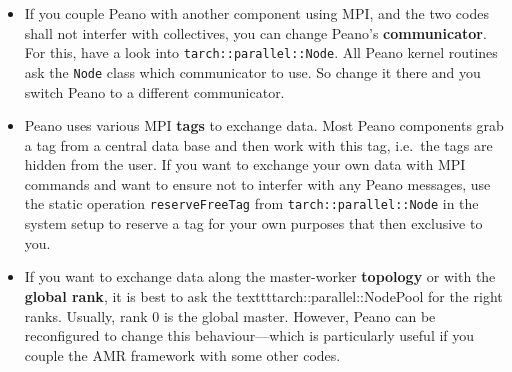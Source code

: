 \begin{itemize}
  \item If you couple Peano with another component using MPI, and the two codes
  shall not interfer with collectives, you can change Peano's {\bf
  communicator}.
  For this, have a look into \texttt{tarch::parallel::Node}. All Peano kernel
  routines ask the \texttt{Node} class which communicator to use. So change it
  there and you switch Peano to a different communicator.
  \item Peano uses various MPI {\bf tags} to exchange data. Most Peano
  components grab a tag from a central data base and then work with this tag,
  i.e.~the tags are hidden from the user. If you want to exchange your own data
  with MPI commands and want to ensure not to interfer with any Peano messages,
  use the static operation \texttt{reserveFreeTag} from
  \texttt{tarch::parallel::Node} in the system setup to reserve a tag for your
  own purposes that then exclusive to you.
  \item If you want to exchange data along the master-worker {\bf topology} or
  with the {\bf global rank}, it is best to ask the
  texttt{tarch::parallel::NodePool} for the right ranks. Usually, rank 0 is the
  global master. However, Peano can be reconfigured to change this
  behaviour---which is particularly useful if you couple the AMR framework with
  some other codes.
\end{itemize}
